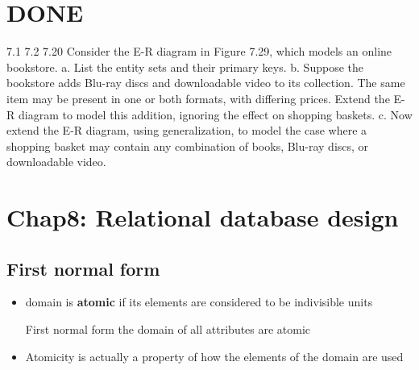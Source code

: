 \documentclass[11pt]{article}
\begin{document}
\section{{\bfseries\sffamily DONE} }
\label{sec-12}
7.1 7.2 7.20
Consider the E-R diagram in Figure 7.29, which models an online bookstore.
a. List the entity sets and their primary keys.
b. Suppose the bookstore adds Blu-ray discs and downloadable video
to its collection. The same item may be present in one or both formats,
with differing prices. Extend the E-R diagram to model this addition,
ignoring the effect on shopping baskets.
c. Now extend the E-R diagram, using generalization, to model the case
where a shopping basket may contain any combination of books,
Blu-ray discs, or downloadable video.
\section{Chap8: Relational database design}
\label{sec-13}
\subsection{First normal form}
\label{sec-13-1}
\begin{itemize}
\item domain is \textbf{atomic} if its elements are considered to be indivisible units
\item[{First normal form}] the domain of all attributes are atomic
\item Atomicity is actually a property of how the elements of the domain are used
\end{itemize}
\end{document}
